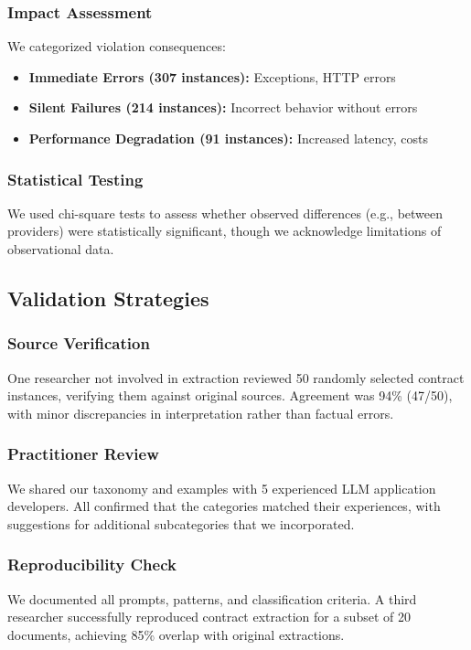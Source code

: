 \documentclass[11pt]{article}
\begin{document}
\subsubsection{Impact Assessment}
We categorized violation consequences:
\begin{itemize}
    \item \textbf{Immediate Errors (307 instances):} Exceptions, HTTP errors
    \item \textbf{Silent Failures (214 instances):} Incorrect behavior without errors
    \item \textbf{Performance Degradation (91 instances):} Increased latency, costs
\end{itemize}

\subsubsection{Statistical Testing}
We used chi-square tests to assess whether observed differences (e.g., between providers) were statistically significant, though we acknowledge limitations of observational data.

\subsection{Validation Strategies}

\subsubsection{Source Verification}
One researcher not involved in extraction reviewed 50 randomly selected contract instances, verifying them against original sources. Agreement was 94\% (47/50), with minor discrepancies in interpretation rather than factual errors.

\subsubsection{Practitioner Review}
We shared our taxonomy and examples with 5 experienced LLM application developers. All confirmed that the categories matched their experiences, with suggestions for additional subcategories that we incorporated.

\subsubsection{Reproducibility Check}
We documented all prompts, patterns, and classification criteria. A third researcher successfully reproduced contract extraction for a subset of 20 documents, achieving 85\% overlap with original extractions.
\end{document}
